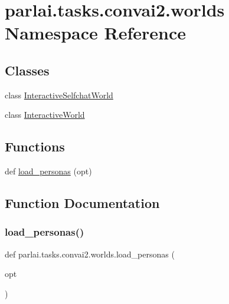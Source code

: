 \hypertarget{namespaceparlai_1_1tasks_1_1convai2_1_1worlds}{}\section{parlai.\+tasks.\+convai2.\+worlds Namespace Reference}
\label{namespaceparlai_1_1tasks_1_1convai2_1_1worlds}
\subsection*{Classes}
\begin{DoxyCompactItemize}
\item 
class \hyperlink{classparlai_1_1tasks_1_1convai2_1_1worlds_1_1InteractiveSelfchatWorld}{Interactive\+Selfchat\+World}
\item 
class \hyperlink{classparlai_1_1tasks_1_1convai2_1_1worlds_1_1InteractiveWorld}{Interactive\+World}
\end{DoxyCompactItemize}
\subsection*{Functions}
\begin{DoxyCompactItemize}
\item 
def \hyperlink{namespaceparlai_1_1tasks_1_1convai2_1_1worlds_a61a758b7cb43183397d002f7f203f586}{load\+\_\+personas} (opt)
\end{DoxyCompactItemize}


\subsection{Function Documentation}
\mbox{\label{namespaceparlai_1_1tasks_1_1convai2_1_1worlds_a61a758b7cb43183397d002f7f203f586}} 
\subsubsection{\texorpdfstring{load\+\_\+personas()}{load\_personas()}}
{\footnotesize\ttfamily def parlai.\+tasks.\+convai2.\+worlds.\+load\+\_\+personas (\begin{DoxyParamCaption}\item[{}]{opt }\end{DoxyParamCaption})}



